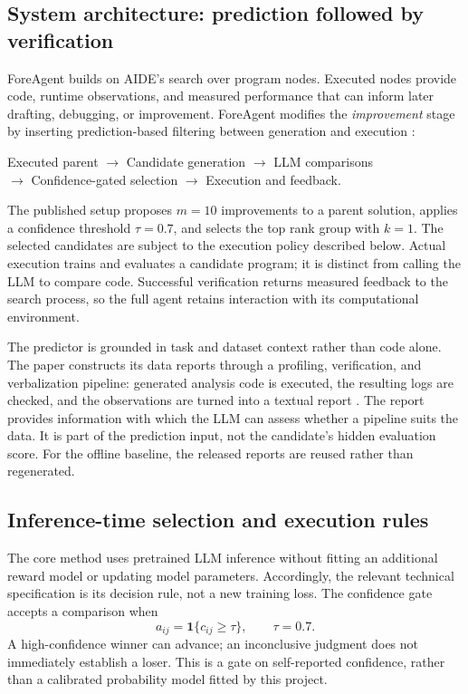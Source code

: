 \documentclass{article}
\begin{document}
\subsection{System architecture: prediction followed by verification}

ForeAgent builds on AIDE's search over program nodes. Executed nodes provide code, runtime observations, and measured performance that can inform later drafting, debugging, or improvement. ForeAgent modifies the \emph{improvement} stage by inserting prediction-based filtering between generation and execution \citep[Section~6.2]{zheng2026predict}:
\begin{center}
\small
Executed parent $\longrightarrow$ Candidate generation $\longrightarrow$ LLM comparisons\\[2pt]
$\longrightarrow$ Confidence-gated selection $\longrightarrow$ Execution and feedback.
\end{center}
The published setup proposes $m=10$ improvements to a parent solution, applies a confidence threshold $\tau=0.7$, and selects the top rank group with $k=1$. The selected candidates are subject to the execution policy described below. Actual execution trains and evaluates a candidate program; it is distinct from calling the LLM to compare code. Successful verification returns measured feedback to the search process, so the full agent retains interaction with its computational environment.

The predictor is grounded in task and dataset context rather than code alone. The paper constructs its data reports through a profiling, verification, and verbalization pipeline: generated analysis code is executed, the resulting logs are checked, and the observations are turned into a textual report \citep[Section~3.4]{zheng2026predict}. The report provides information with which the LLM can assess whether a pipeline suits the data. It is part of the prediction input, not the candidate's hidden evaluation score. For the offline baseline, the released reports are reused rather than regenerated.

\subsection{Inference-time selection and execution rules}

The core method uses pretrained LLM inference without fitting an additional reward model or updating model parameters. Accordingly, the relevant technical specification is its decision rule, not a new training loss. The confidence gate accepts a comparison when
\begin{equation}
  a_{ij}=\mathbf{1}\{c_{ij}\geq\tau\},\qquad \tau=0.7.
  \label{eq:gate}
\end{equation}
A high-confidence winner can advance; an inconclusive judgment does not immediately establish a loser. This is a gate on self-reported confidence, rather than a calibrated probability model fitted by this project.
\end{document}
